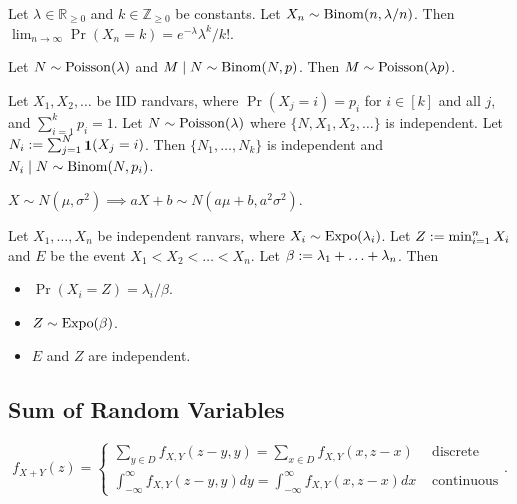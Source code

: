 \documentclass[a4paper, 12pt, fleqn]{article}
\DeclareMathOperator{\boolone}{\mathbf{1}}
\begin{document}
\begin{theorem}
Let $\lambda \in \mathbb{R}_{\ge 0}$ and $k \in \mathbb{Z}_{\ge 0}$ be constants.
Let $X_n \sim \operatorname{Binom}(n, \lambda/n)$.
Then $\lim_{n \to \infty} \Pr(X_n = k) = e^{-\lambda}\lambda^k/k!$.
\end{theorem}

\begin{theorem}
Let $N \sim \operatorname{Poisson}(\lambda)$ and $M \mid N \sim \operatorname{Binom}(N, p)$.
Then $M \sim \operatorname{Poisson}(\lambda p)$.
\end{theorem}

\begin{theorem}
Let $X_1, X_2, \ldots$ be IID randvars, where $\Pr(X_j = i) = p_i$ for $i \in [k]$ and all $j$,
and $\sum_{i=1}^k p_i = 1$.
Let $N \sim \operatorname{Poisson}(\lambda)$ where $\{N, X_1, X_2, \ldots\}$ is independent.
Let $N_i \defeq \sum_{j=1}^N \boolone(X_j = i)$. Then
$\{N_1, \ldots, N_k\}$ is independent and $N_i \mid N \sim \operatorname{Binom}(N, p_i)$.
\end{theorem}

\begin{theorem}
$X \sim N(\mu, \sigma^2) \implies aX + b \sim N(a\mu + b, a^2\sigma^2)$.
\end{theorem}

\begin{theorem}
Let $X_1, \ldots, X_n$ be independent ranvars, where $X_i \sim \operatorname{Expo}(\lambda_i)$.
Let $Z := \min_{i=1}^n X_i$ and $E$ be the event $X_1 < X_2 < \ldots < X_n$.
Let $\beta := \lambda_1 + \ldots + \lambda_n$. Then
\begin{itemize}
\item $\Pr(X_i = Z) = \lambda_i/\beta$.
\item $Z \sim \operatorname{Expo}(\beta)$.
\item $E$ and $Z$ are independent.
\end{itemize}
\end{theorem}

\subsection{Sum of Random Variables}

\begin{theorem}[Convolution]
\[ f_{X+Y}(z) = \begin{cases}
\displaystyle \sum_{y \in D} f_{X, Y}(z - y, y) = \sum_{x \in D} f_{X, Y}(x, z-x)
    & \textrm{ discrete}
\\[1.2em] \displaystyle
\int_{-\infty}^{\infty} f_{X, Y}(z - y, y) dy = \int_{-\infty}^{\infty} f_{X, Y}(x, z-x) dx
    & \textrm{ continuous}
\end{cases}. \]
\end{theorem}
\end{document}
